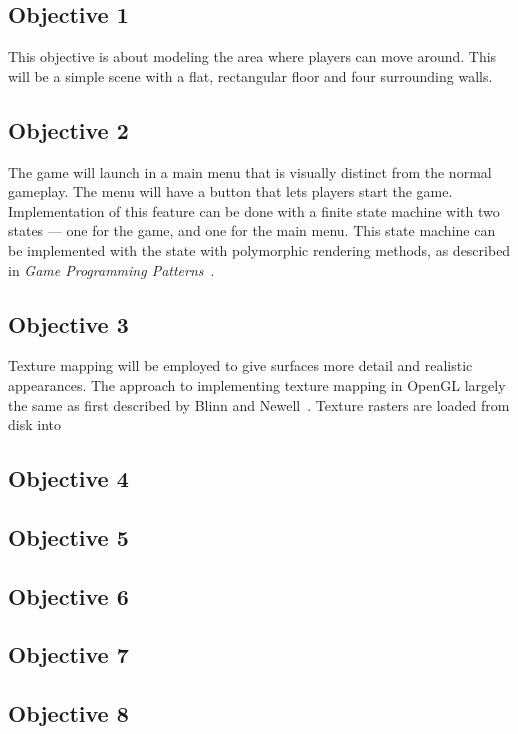 \documentclass {article}
\begin{document}
\subsection{Objective 1}
This objective is about modeling the area where players can move around. This will be a simple scene with a flat, rectangular floor and four surrounding walls.

\subsection{Objective 2}
The game will launch in a main menu that is visually distinct from the normal gameplay. The menu will have a button that lets players start the game. Implementation of this feature can be done with a finite state machine with two states --- one for the game, and one for the main menu. This state machine can be implemented with the state with polymorphic rendering methods, as described in \textit{Game Programming Patterns}~\cite{state}.

\subsection{Objective 3}
Texture mapping will be employed to give surfaces more detail and realistic appearances. The approach to implementing texture mapping in OpenGL largely the same as first described by Blinn and Newell~\cite{texture}. Texture rasters are loaded from disk into 


\subsection{Objective 4}
\subsection{Objective 5}
\subsection{Objective 6}
\subsection{Objective 7}
\subsection{Objective 8}
\end{document}
